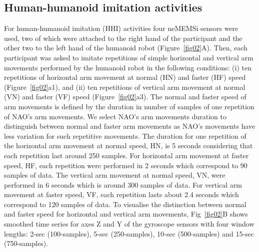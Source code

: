 \documentclass[fleqn,10pt]{wlscirep}
\begin{document}
\subsection*{Human-humanoid imitation activities}
For human-humanoid imitation (HHI) activities four neMEMSi sensors were used, two of which were attached to the right hand of the participant and the other two to the left hand of the humanoid robot (Figure~\ref{fig02}A).
Then, each participant was asked to imitate repetitions of simple horizontal and vertical arm movements performed by the humanoid robot in the following conditions:
(i) ten repetitions of horizontal arm movement at normal (HN) and faster (HF) speed (Figure~\ref{fig02}a1), and
(ii) ten repetitions of vertical arm movement at normal (VN) and faster (VF) speed (Figure~\ref{fig02}a3).
The normal and faster speed of arm movements is defined by the duration in number of samples of one repetition of NAO's arm movements.
We select NAO's arm movements duration to distinguish between normal and faster arm movements as NAO's movements have less variation for such repetitive movements.
The duration for one repetition of the horizontal arm movement at normal speed, HN, is 5 seconds considering that each repetition last around 250 samples.
For horizontal arm movement at faster speed, HF, each repetition were performed in 2 seconds which correspond to 90 samples of data.
The vertical arm movement at normal speed, VN, were performed  in 6 seconds which is around 300 samples of data.
For vertical arm movement at faster speed, VF, each repetition lasts about 2.4 seconds which correspond to 120 samples of data.
To visualise the distinction between normal and faster speed for horizontal and vertical arm movements, Fig~\ref{fig02}B shows smoothed time series for axes Z and Y of the gyroscope sensors with four window lengths: 2-sec (100-samples), 5-sec (250-samples), 10-sec (500-samples) and 15-sec (750-samples).
\end{document}
